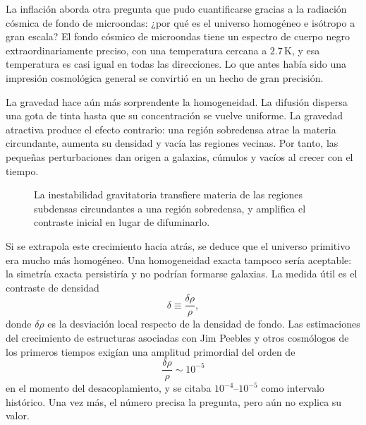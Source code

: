 La inflación aborda otra pregunta que pudo cuantificarse gracias a la radiación cósmica de fondo de microondas: ¿por qué es el universo homogéneo e isótropo a gran escala? El fondo cósmico de microondas tiene un espectro de cuerpo negro extraordinariamente preciso, con una temperatura cercana a \(2.7\,\mathrm K\), y esa temperatura es casi igual en todas las direcciones. Lo que antes había sido una impresión cosmológica general se convirtió en un hecho de gran precisión.

La gravedad hace aún más sorprendente la homogeneidad. La difusión dispersa una gota de tinta hasta que su concentración se vuelve uniforme. La gravedad atractiva produce el efecto contrario: una región sobredensa atrae la materia circundante, aumenta su densidad y vacía las regiones vecinas. Por tanto, las pequeñas perturbaciones dan origen a galaxias, cúmulos y vacíos al crecer con el tiempo.

\begin{figure}[htbp]
\centering
\begin{coursefitfigure}
\end{coursefitfigure}
\caption{La inestabilidad gravitatoria transfiere materia de las regiones subdensas circundantes a una región sobredensa, y amplifica el contraste inicial en lugar de difuminarlo.}
\label{fig:c08-gravity-growth}
\end{figure}

Si se extrapola este crecimiento hacia atrás, se deduce que el universo primitivo era mucho más homogéneo. Una homogeneidad exacta tampoco sería aceptable: la simetría exacta persistiría y no podrían formarse galaxias. La medida útil es el contraste de densidad
\begin{equation}
\delta\equiv\frac{\delta\rho}{\rho},
\end{equation}
donde \(\delta\rho\) es la desviación local respecto de la densidad de fondo. Las estimaciones del crecimiento de estructuras asociadas con Jim Peebles y otros cosmólogos de los primeros tiempos exigían una amplitud primordial del orden de
\begin{equation}
\boxed{\frac{\delta\rho}{\rho}\sim10^{-5}}
\end{equation}
en el momento del desacoplamiento, y se citaba \(10^{-4}\)--\(10^{-5}\) como intervalo histórico. Una vez más, el número precisa la pregunta, pero aún no explica su valor.

